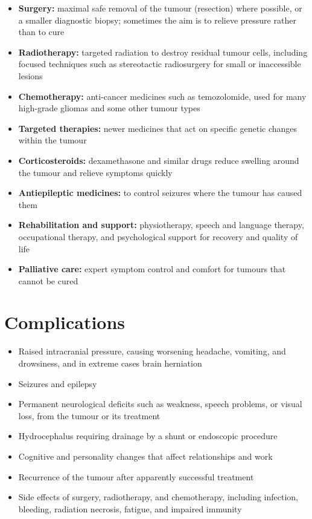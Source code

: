 \begin{itemize}
    \item \textbf{Surgery:} maximal safe removal of the tumour (resection) where possible, or a smaller diagnostic biopsy; sometimes the aim is to relieve pressure rather than to cure
    \item \textbf{Radiotherapy:} targeted radiation to destroy residual tumour cells, including focused techniques such as stereotactic radiosurgery for small or inaccessible lesions
    \item \textbf{Chemotherapy:} anti-cancer medicines such as temozolomide, used for many high-grade gliomas and some other tumour types
    \item \textbf{Targeted therapies:} newer medicines that act on specific genetic changes within the tumour
    \item \textbf{Corticosteroids:} dexamethasone and similar drugs reduce swelling around the tumour and relieve symptoms quickly
    \item \textbf{Antiepileptic medicines:} to control seizures where the tumour has caused them
    \item \textbf{Rehabilitation and support:} physiotherapy, speech and language therapy, occupational therapy, and psychological support for recovery and quality of life
    \item \textbf{Palliative care:} expert symptom control and comfort for tumours that cannot be cured
\end{itemize}

\section*{Complications}
\begin{itemize}
    \item Raised intracranial pressure, causing worsening headache, vomiting, and drowsiness, and in extreme cases brain herniation
    \item Seizures and epilepsy
    \item Permanent neurological deficits such as weakness, speech problems, or visual loss, from the tumour or its treatment
    \item Hydrocephalus requiring drainage by a shunt or endoscopic procedure
    \item Cognitive and personality changes that affect relationships and work
    \item Recurrence of the tumour after apparently successful treatment
    \item Side effects of surgery, radiotherapy, and chemotherapy, including infection, bleeding, radiation necrosis, fatigue, and impaired immunity
\end{itemize}

